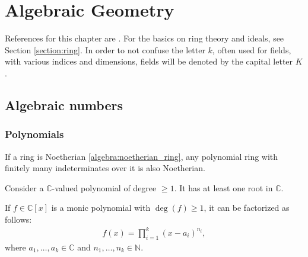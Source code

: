 \chapter{Algebraic Geometry}\label{chapter:alggeom}

    References for this chapter are \cite{gathmann, redbook}. For the basics on ring theory and ideals, see Section \ref{section:ring}. In order to not confuse the letter $k$, often used for fields, with various indices and dimensions, fields will be denoted by the capital letter $K$.

\section{Algebraic numbers}
\subsection{Polynomials}


    \begin{theorem}
        If a ring is Noetherian \ref{algebra:noetherian_ring}, any polynomial ring with finitely many indeterminates over it is also Noetherian.
    \end{theorem}


    \begin{theorem}\label{alggeom:fundamental_theorem_of_algebra}
        Consider a $\mathbb{C}$-valued polynomial of degree $\geq 1$. It has at least one root in $\mathbb{C}$.
    \end{theorem}
    \begin{result}
        If $f\in \mathbb{C}[x]$ is a monic polynomial with $\deg(f)\geq1$, it can be factorized as follows:
        \begin{gather*}
            f(x) = \prod_{i=1}^k(x-a_i)^{n_i},
        \end{gather*}
        where $a_1,\ldots, a_k\in\mathbb{C}$ and $n_1,\ldots,n_k\in\mathbb{N}$.
    \end{result}

